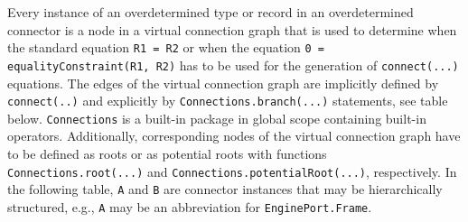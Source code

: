 Every instance of an overdetermined type or record in an overdetermined
connector is a node in a virtual connection graph that is used to
determine when the standard equation \lstinline!R1 = R2! or when the equation
\lstinline!0 = equalityConstraint(R1, R2)! has to be used for the generation of
\lstinline!connect(...)! equations. The edges of the virtual connection graph are
implicitly defined by \lstinline!connect(..)! and explicitly by
\lstinline!Connections.branch(...)! statements, see table below. \lstinline!Connections! is a
built-in package in global scope containing built-in operators.
Additionally, corresponding nodes of the virtual connection graph have
to be defined as roots or as potential roots with functions
\lstinline!Connections.root(...)! and \lstinline!Connections.potentialRoot(...)!, respectively.
In the following table, \lstinline!A! and \lstinline!B! are connector instances that may be
hierarchically structured, e.g., \lstinline!A! may be an abbreviation for
\lstinline!EnginePort.Frame!.

